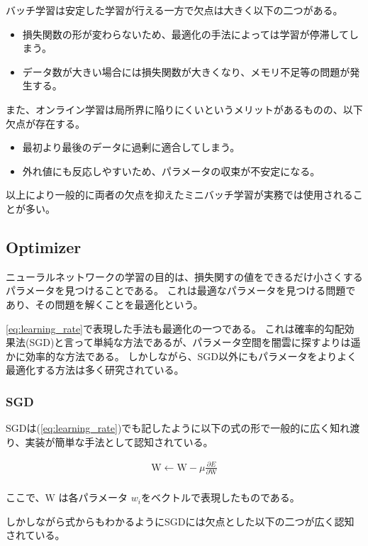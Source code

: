 バッチ学習は安定した学習が行える一方で欠点は大きく以下の二つがある。

\begin{itemize}
  \item 損失関数の形が変わらないため、最適化の手法によっては学習が停滞してしまう。
  \item データ数が大きい場合には損失関数が大きくなり、メモリ不足等の問題が発生する。
\end{itemize}

また、オンライン学習は局所界に陥りにくいというメリットがあるものの、以下欠点が存在する。

\begin{itemize}
  \item 最初より最後のデータに過剰に適合してしまう。
  \item 外れ値にも反応しやすいため、パラメータの収束が不安定になる。
\end{itemize}

以上により一般的に両者の欠点を抑えたミニバッチ学習が実務では使用されることが多い。

\subsection{Optimizer}
ニューラルネットワークの学習の目的は、損失関すの値をできるだけ小さくするパラメータを見つけることである。
これは最適なパラメータを見つける問題であり、その問題を解くことを最適化という。

\ref{eq:learning_rate}で表現した手法も最適化の一つである。
これは確率的勾配効果法(SGD)と言って単純な方法であるが、パラメータ空間を闇雲に探すよりは遥かに効率的な方法である。
しかしながら、SGD以外にもパラメータをよりよく最適化する方法は多く研究されている。

\subsubsection{SGD}
SGDは(\ref{eq:learning_rate})でも記したように以下の式の形で一般的に広く知れ渡り、実装が簡単な手法として認知されている。

\begin{eqnarray}
\mathrm{W} \leftarrow \mathrm{W} - \mu \frac{\partial E}{\partial \mathrm{W}} \\
\label{eq:sgd}
\end{eqnarray}

ここで、$ \mathrm{W} $ は各パラメータ $ w_i $をベクトルで表現したものである。

しかしながら式からもわかるようにSGDには欠点とした以下の二つが広く認知されている。




